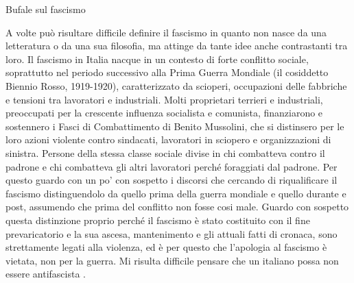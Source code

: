 \documentclass[12pt]{book} %
\begin{document}
\begin{mdframed}[linewidth=1pt]
Bufale sul fascismo

A volte può risultare difficile definire il fascismo in quanto non nasce da una letteratura o da una sua filosofia, ma attinge da tante idee anche contrastanti tra loro. 
Il fascismo in Italia nacque in un contesto di forte conflitto sociale, soprattutto nel periodo successivo alla Prima Guerra Mondiale (il cosiddetto Biennio Rosso, 1919-1920), caratterizzato da scioperi, occupazioni delle fabbriche e tensioni tra lavoratori e industriali.
Molti proprietari terrieri e industriali, preoccupati per la crescente influenza socialista e comunista, finanziarono e sostennero i Fasci di Combattimento di Benito Mussolini, che si distinsero per le loro azioni violente contro sindacati, lavoratori in sciopero e organizzazioni di sinistra. Persone della stessa classe sociale divise in chi combatteva contro il padrone e chi combatteva gli altri lavoratori perché foraggiati dal padrone.
Per questo guardo con un po' con sospetto i discorsi che cercando di riqualificare il fascismo distinguendolo da quello prima della guerra mondiale e quello durante e post, assumendo che prima del conflitto non fosse cosi male. Guardo con sospetto questa distinzione proprio perché il fascismo è stato costituito con il fine prevaricatorio e la sua ascesa, mantenimento e gli attuali fatti di cronaca, sono strettamente legati alla violenza, ed è per questo che l'apologia al fascismo è vietata, non per la guerra. Mi risulta difficile pensare che un italiano possa non essere antifascista  .


\end{mdframed}
\end{document}
